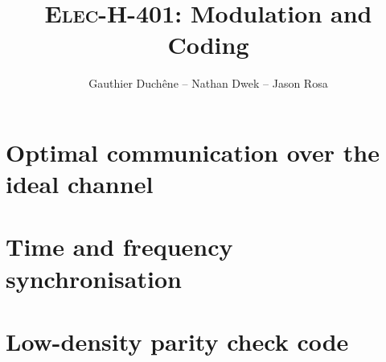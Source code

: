 

\title{\textsc{Elec-H-401}: Modulation and Coding}
\author{Gauthier Duchêne -- Nathan Dwek -- Jason Rosa}
\date{}


\maketitle
\tableofcontents
\clearpage
\hypersetup{allcolors = link}

\section{Optimal communication over the ideal channel}


\section{Time and frequency synchronisation}


\section{Low-density parity check code}


\clearpage
\hypersetup{allcolors=black}
\listoffigures
{}


